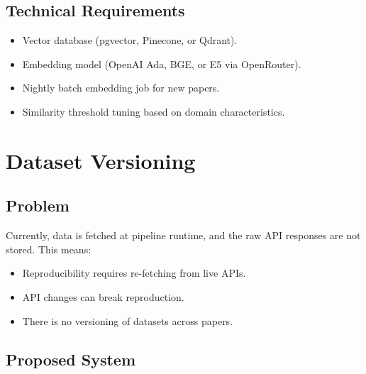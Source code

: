 \subsection{Technical Requirements}

\begin{itemize}
  \item Vector database (pgvector, Pinecone, or Qdrant).
  \item Embedding model (OpenAI Ada, BGE, or E5 via OpenRouter).
  \item Nightly batch embedding job for new papers.
  \item Similarity threshold tuning based on domain characteristics.
\end{itemize}

\section{Dataset Versioning}
\label{sec:improve:versioning}

\subsection{Problem}

Currently, data is fetched at pipeline runtime, and the raw API responses are not stored.
This means:
\begin{itemize}
  \item Reproducibility requires re-fetching from live APIs.
  \item API changes can break reproduction.
  \item There is no versioning of datasets across papers.
\end{itemize}

\subsection{Proposed System}

